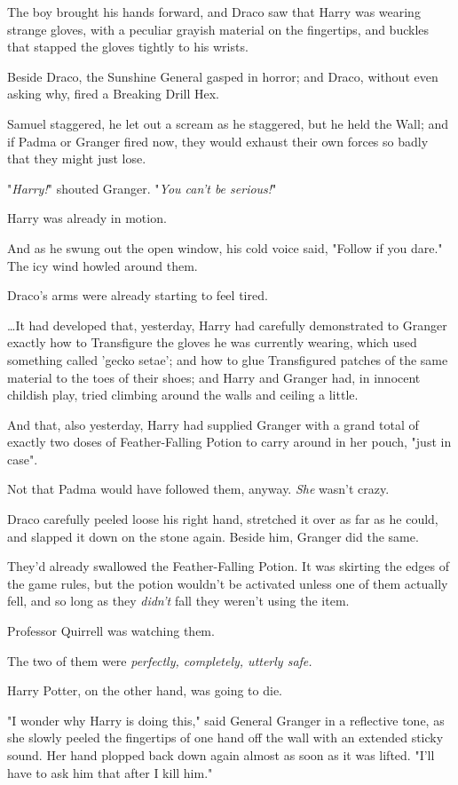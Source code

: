 The boy brought his hands forward, and Draco saw that Harry was wearing strange 
gloves, with a peculiar grayish material on the fingertips, and buckles that 
stapped the gloves tightly to his wrists.

Beside Draco, the Sunshine General gasped in horror; and Draco, without even 
asking why, fired a Breaking Drill Hex.

Samuel staggered, he let out a scream as he staggered, but he held the Wall; 
and if Padma or Granger fired now, they would exhaust their own forces so badly 
that they might just lose.

"\emph{Harry!}" shouted Granger. "\emph{You can't be serious!}"

Harry was already in motion.

And as he swung out the open window, his cold voice said, "Follow if you dare."
\sbreak
The icy wind howled around them.

Draco's arms were already starting to feel tired.

{\ldots}It had developed that, yesterday, Harry had carefully demonstrated to 
Granger exactly how to Transfigure the gloves he was currently wearing, which 
used something called 'gecko setae'; and how to glue Transfigured patches of 
the same material to the toes of their shoes; and Harry and Granger had, in 
innocent childish play, tried climbing around the walls and ceiling a little.

And that, also yesterday, Harry had supplied Granger with a grand total of 
exactly two doses of Feather-Falling Potion to carry around in her pouch, "just 
in case".

Not that Padma would have followed them, anyway. \emph{She} wasn't crazy.

Draco carefully peeled loose his right hand, stretched it over as far as he 
could, and slapped it down on the stone again. Beside him, Granger did the same.

They'd already swallowed the Feather-Falling Potion. It was skirting the edges 
of the game rules, but the potion wouldn't be activated unless one of them 
actually fell, and so long as they \emph{didn't} fall they weren't using the 
item.

Professor Quirrell was watching them.

The two of them were \emph{perfectly, completely, utterly safe.}

Harry Potter, on the other hand, was going to die.

"I wonder why Harry is doing this," said General Granger in a reflective tone, 
as she slowly peeled the fingertips of one hand off the wall with an extended 
sticky sound. Her hand plopped back down again almost as soon as it was lifted. 
"I'll have to ask him that after I kill him."

